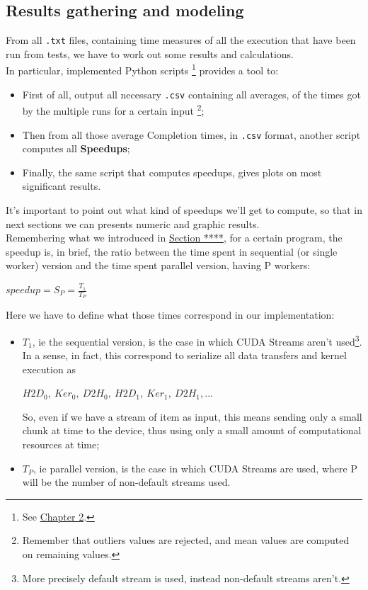 \subsection{Results gathering and modeling}
\label{subs:resgath}
From all \texttt{.txt} files, containing time measures of all the execution that have been run from tests, we have to work out some results and calculations.\\
In particular, implemented Python scripts \footnote{See \hyperref[chap:tools]{Chapter 2}.} provides a tool to:
\begin{itemize}
	\item First of all, output all necessary \texttt{.csv} containing all averages, of the times got by the multiple runs for a certain input \footnote{Remember that outliers values are rejected, and mean values are computed on remaining values.};
	\item Then from all those average Completion times, in \texttt{.csv} format, another script computes all \textbf{Speedups};
	\item Finally, the same script that computes speedups, gives plots on most significant results.
\end{itemize}
It's important to point out what kind of speedups we'll get to compute, so that in next sections we can presents numeric and graphic results.\\
Remembering what we introduced in \hyperref[subs:speedup]{Section ****}, for a certain program, the speedup is, in brief, the ratio between the time spent in sequential (or single worker) version and the time spent parallel version, having P workers:
\begin{center}
	\(speedup = S_{P} = \frac{T_{1}}{T_{P}} \)
\end{center}
Here we have to define what those times correspond in our implementation:
\begin{itemize}
	\item \(T_{1}\), ie the sequential version, is the case in which CUDA Streams aren't used\footnote{More precisely default stream is used, instead non-default streams aren't.}. In a sense, in fact, this correspond to serialize all data transfers and kernel execution as
	\begin{center}
		\(H2D_{0},\ Ker_{0},\ D2H_{0},\ H2D_{1},\ Ker_{1},\ D2H_{1}, . . .\)
	\end{center}
	So, even if we have a stream of item as input, this means sending only a small chunk at time to the device, thus using only a small amount of computational resources at time;
	\item \(T_{P}\), ie parallel version, is the case in which CUDA Streams are used, where P will be the number of non-default streams used.
\end{itemize}
